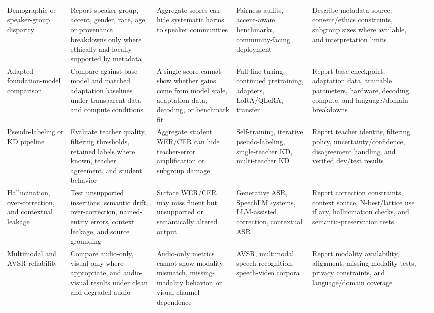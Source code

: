 \documentclass[pdflatex,sn-basic,iicol]{sn-jnl}
\theoremstyle{thmstyleone}
\theoremstyle{thmstyletwo}
\theoremstyle{thmstylethree}
\begin{document}
\begin{table}[htbp]
\begin{tabularx}{\textwidth}{YYYYYY}
Demographic or speaker-group disparity & Report speaker-group, accent, gender, race, age, or provenance breakdowns only where ethically and locally supported by metadata & Aggregate scores can hide systematic harms to speaker communities & Fairness audits, accent-aware benchmarks, community-facing deployment & Describe metadata source, consent/ethics constraints, subgroup sizes where available, and interpretation limits & \citep{koenecke2020racialdisparities,liu2021casualconversations,olatunji2023_afrispeech200} \\
Adapted foundation-model comparison & Compare against base model and matched adaptation baselines under transparent data and compute conditions & A single score cannot show whether gains come from model scale, adaptation data, decoding, or benchmark fit & Full fine-tuning, continued pretraining, adapters, LoRA/QLoRA, transfer & Report base checkpoint, adaptation data, trainable parameters, hardware, decoding, compute, and language/domain breakdowns & \citep{babu22_interspeech,pmlr-v202-radford23a,pratap2024mms,qian24_interspeech} \\
Pseudo-labeling or KD pipeline & Evaluate teacher quality, filtering thresholds, retained labels where known, teacher agreement, and student behavior & Aggregate student WER/CER can hide teacher-error amplification or subgroup damage & Self-training, iterative pseudo-labeling, single-teacher KD, multi-teacher KD & Report teacher identity, filtering policy, uncertainty/confidence, disagreement handling, and verified dev/test results & \citep{park20d_interspeech,khurana2020dust,leal21_interspeech,bhogale24_interspeech} \\
Hallucination, over-correction, and contextual leakage & Test unsupported insertions, semantic drift, over-correction, named-entity errors, context leakage, and source grounding & Surface WER/CER may miss fluent but unsupported or semantically altered output & Generative ASR, SpeechLM systems, LLM-assisted correction, contextual ASR & Report correction constraints, context source, N-best/lattice use if any, hallucination checks, and semantic-preservation tests & \citep{koenecke2024carelesswhisper,koudounas2025shallow,wang2025contextasrbench,ma2024asrerrorcorrection} \\
Multimodal and AVSR reliability & Compare audio-only, visual-only where appropriate, and audio-visual results under clean and degraded audio & Audio-only metrics cannot show modality mismatch, missing-modality behavior, or visual-channel dependence & AVSR, multimodal speech recognition, speech-video corpora & Report modality availability, alignment, missing-modality tests, privacy constraints, and language/domain coverage & \citep{shi2022avhubert,shi2022robustavsr,anwar23_interspeech} \\

\end{tabularx}
\end{table}
\end{document}
